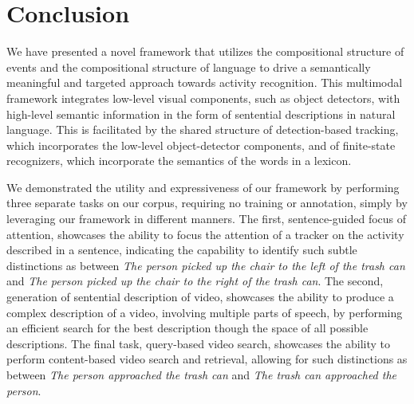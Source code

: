 \section{Conclusion}
\label{sec-st1:conclusion}
%
We have presented a novel framework that utilizes the compositional structure
of events and the compositional structure of language to drive a semantically
meaningful and targeted approach towards activity recognition.
%
This multimodal framework integrates low-level visual components, such as object
detectors, with high-level semantic information in the form of sentential
descriptions in natural language.
%
This is facilitated by the shared structure of detection-based tracking, which
incorporates the low-level object-detector components, and of finite-state
recognizers, which incorporate the semantics of the words in a lexicon.

We demonstrated the utility and expressiveness of our framework by performing
three separate tasks on our corpus, requiring no training or annotation, simply
by leveraging our framework in different manners.
%
The first, sentence-guided focus of attention, showcases the ability to focus
the attention of a tracker on the activity described in a sentence, indicating
the capability to identify such subtle distinctions as between \emph{The person
  picked up the chair to the left of the trash can} and \emph{The person picked
  up the chair to the right of the trash can}.
%
The second, generation of sentential description of video, showcases the
ability to produce a complex description of a video, involving multiple parts
of speech, by performing an efficient search for the best description though
the space of all possible descriptions.
%
The final task, query-based video search, showcases the ability to perform
content-based video search and retrieval, allowing for such distinctions as
between \emph{The person approached the trash can} and \emph{The trash can
  approached the person}.

